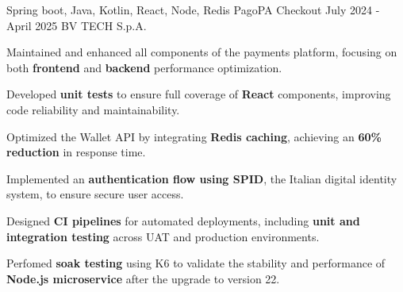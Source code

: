 

\begin{cventries}

  \cventry
    {Spring boot, Java, Kotlin, React, Node, Redis} %
    {PagoPA Checkout} %
    {July 2024 - April 2025} %
    {BV TECH S.p.A.} %
    {
      \begin{cvitems} %
        \item {Maintained and enhanced all components of the payments platform, focusing on both \textbf{frontend} and \textbf{backend} performance optimization.}
        \item {Developed \textbf{unit tests} to ensure full coverage of \textbf{React} components, improving code reliability and maintainability.}  
        \item {Optimized the Wallet API by integrating \textbf{Redis caching}, achieving an \textbf{60\% reduction} in response time.}  
        \item {Implemented an \textbf{authentication flow using SPID}, the Italian digital identity system, to ensure secure user access.}  
        \item {Designed \textbf{CI pipelines} for automated deployments, including \textbf{unit and integration testing} across UAT and production environments.}  
        \item {Perfomed \textbf{soak testing} using K6 to validate the stability and performance of \textbf{Node.js microservice} after the upgrade to version 22.}  
      \end{cvitems}
    }


\end{cventries}
